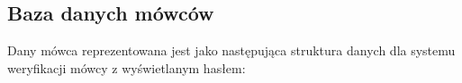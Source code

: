 \subsection{Baza danych mówców}
Dany mówca reprezentowana jest jako następująca struktura danych dla systemu weryfikacji mówcy z wyświetlanym hasłem:
\begin{lstlisting}

\end{lstlisting}


